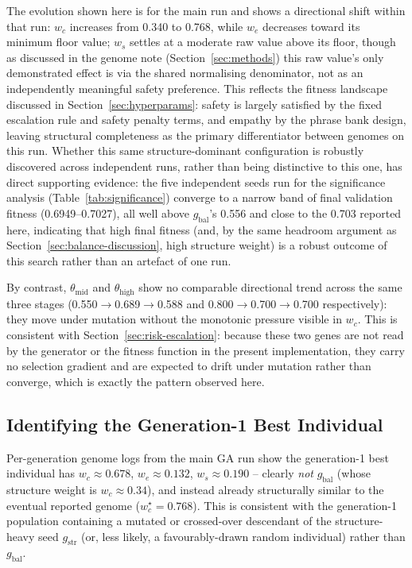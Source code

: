 \documentclass[mathematics,article,submit,xetex,moreauthors]{Definitions/mdpi}
\begin{document}
The evolution shown here is for the main run and shows a
directional shift within that run: $w_c$ increases from 0.340
to 0.768, while $w_e$ decreases toward its minimum floor
value; $w_s$ settles at a moderate raw value above its floor, though as
discussed in the genome note (Section~\ref{sec:methods}) this raw value's
only demonstrated effect is via the shared normalising denominator, not as
an independently meaningful safety preference. This reflects the fitness
landscape discussed in Section~\ref{sec:hyperparams}: safety is largely
satisfied by the fixed escalation rule and safety penalty terms, and
empathy by the phrase bank design, leaving structural completeness as the primary differentiator between
genomes on this run. Whether this same structure-dominant configuration is
robustly discovered across independent runs, rather than being
distinctive to this one, has direct supporting evidence: the five
independent seeds run for the significance analysis
(Table~\ref{tab:significance}) converge to a narrow band of final
validation fitness (0.6949--0.7027), all well above $g_\mathrm{bal}$'s
0.556 and close to the 0.703 reported here, indicating that high final
fitness (and, by the same headroom argument as Section~\ref{sec:balance-discussion},
high structure weight) is a robust outcome of this search rather than an
artefact of one run.

By contrast, $\theta_\mathrm{mid}$ and $\theta_\mathrm{high}$ show no
comparable directional trend across the same three stages
(0.550$\to$0.689$\to$0.588 and 0.800$\to$0.700$\to$0.700 respectively): they
move under mutation without the monotonic pressure visible in $w_c$. This is
consistent with Section~\ref{sec:risk-escalation}: because these two genes
are not read by the generator or the fitness function in the present
implementation, they carry no selection gradient and are expected to drift
under mutation rather than converge, which is exactly the pattern observed
here.

\subsection{Identifying the Generation-1 Best Individual}
\label{app:gen1}

Per-generation genome logs from the main GA run show the generation-1 best
individual has $w_c \approx 0.678$, $w_e \approx 0.132$, $w_s \approx
0.190$ -- clearly \emph{not} $g_\mathrm{bal}$ (whose structure weight is
$w_c \approx 0.34$), and instead already structurally similar to the
eventual reported genome ($w_c^{\star} = 0.768$). This is consistent with
the generation-1 population containing a mutated or crossed-over
descendant of the structure-heavy seed $g_\mathrm{str}$ (or, less likely,
a favourably-drawn random individual) rather than $g_\mathrm{bal}$.
\end{document}

